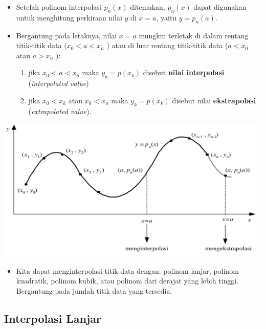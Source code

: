 \documentclass[pdflatex,compress,mathserif]{beamer}
\begin{document}
\begin{frame}
	\begin{itemize}
		\item Setelah polinom interpolasi $ p_n(x) $ ditemukan, $ p_n(x) $ dapat digunakan untuk menghitung perkiraan nilai $ y $ di $ x = a $, yaitu $ y = p_n(a) $.
		\item Bergantung pada letaknya, nilai $ x = a $ mungkin terletak di dalam rentang titik-titik data ($ x_0 < a < x_n $ ) atau di luar rentang titik-titik data ($ a < x_0 $ atau $ a > x_n $ ):
		\begin{enumerate}
			\item jika $ x_0 < a < x_n $ maka $ y_k = p(x_k) $ disebut \textbf{nilai interpolasi} (\textit{interpolated value})
			\item jika $ x_0 < x_k $ atau $ x_0 < x_n $ maka $ y_k = p(x_k) $ disebut nilai \textbf{ekstrapolasi} (\textit{extrapolated value}).
		\end{enumerate}
	\end{itemize}
\end{frame}

\begin{frame}
	\begin{center}
		\includegraphics[width=0.7\linewidth]{img/img03}
	\end{center}
	\begin{itemize}
		\item Kita dapat menginterpolasi titik data dengan: polinom lanjar, polinom kuadratik, polinom kubik, atau polinom dari derajat yang lebih tinggi. Bergantung pada jumlah titik data yang tersedia.
	\end{itemize}
\end{frame}

\subsection{Interpolasi Lanjar}
\end{document}

